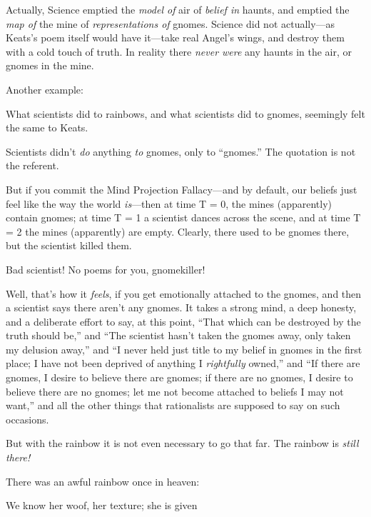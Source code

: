 {
 Actually, Science emptied the \textit{model of} air of
\textit{belief in} haunts, and emptied the \textit{map of} the mine of
\textit{representations of} gnomes. Science did not actually---as
Keats's poem itself would have it---take real
Angel's wings, and destroy them with a cold touch of
truth. In reality there \textit{never were} any haunts in the air, or
gnomes in the mine.}

{
 Another example:}

{
 What scientists did to rainbows, and what scientists did to
gnomes, seemingly felt the same to Keats.}

{
 Scientists didn't \textit{do} anything \textit{to}
gnomes, only to ``gnomes.'' The
quotation is not the referent.}

{
 But if you commit the Mind Projection Fallacy---and by default,
our beliefs just feel like the way the world \textit{is}{}---then at
time T = 0, the mines (apparently) contain gnomes; at time T = 1 a
scientist dances across the scene, and at time T = 2 the mines
(apparently) are empty. Clearly, there used to be gnomes there, but the
scientist killed them.}

{
 Bad scientist! No poems for you, gnomekiller!}

{
 Well, that's how it \textit{feels}, if you get
emotionally attached to the gnomes, and then a scientist says there
aren't any gnomes. It takes a strong mind, a deep
honesty, and a deliberate effort to say, at this point,
``That which can be destroyed by the truth should
be,'' and ``The scientist
hasn't taken the gnomes away, only taken my delusion
away,'' and ``I never held just
title to my belief in gnomes in the first place; I have not been
deprived of anything I \textit{rightfully} owned,''
and ``If there are gnomes, I desire to believe there
are gnomes; if there are no gnomes, I desire to believe there are no
gnomes; let me not become attached to beliefs I may not
want,'' and all the other things that rationalists
are supposed to say on such occasions.}

{
 But with the rainbow it is not even necessary to go that far. The
rainbow is \textit{still there!}}

\myendsectiontext


\bigskip


{
 There was an awful rainbow once in heaven:}

{
 We know her woof, her texture; she is given}

